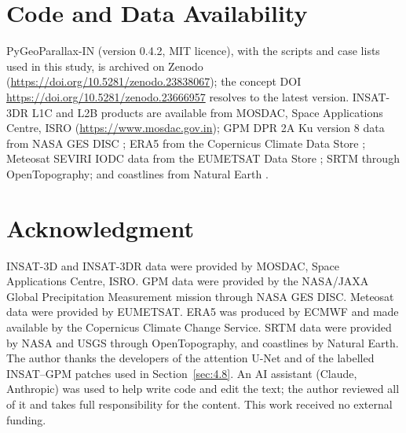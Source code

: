 \documentclass[journal]{IEEEtran}
\begin{document}









\appendix


\section*{Code and Data Availability}
PyGeoParallax-IN (version 0.4.2, MIT licence), with the scripts and case lists used in this study, is archived on Zenodo \cite{pygeoparallax} (\url{https://doi.org/10.5281/zenodo.23838067}); the concept DOI \url{https://doi.org/10.5281/zenodo.23666957} resolves to the latest version. INSAT-3DR L1C and L2B products are available from MOSDAC, Space Applications Centre, ISRO (\url{https://www.mosdac.gov.in}); GPM DPR 2A Ku version 8 data from NASA GES DISC \cite{gpm2aku_v08}; ERA5 from the Copernicus Climate Data Store \cite{c3s2018}; Meteosat SEVIRI IODC data from the EUMETSAT Data Store \cite{eumetsat_iodc}; SRTM \cite{farr2007} through OpenTopography; and coastlines from Natural Earth \cite{naturalearth}.

\section*{Acknowledgment}
INSAT-3D and INSAT-3DR data were provided by MOSDAC, Space Applications Centre, ISRO. GPM data were provided by the NASA/JAXA Global Precipitation Measurement mission through NASA GES DISC. Meteosat data were provided by EUMETSAT. ERA5 was produced by ECMWF and made available by the Copernicus Climate Change Service. SRTM data were provided by NASA and USGS through OpenTopography, and coastlines by Natural Earth. The author thanks the developers of the attention U-Net and of the labelled INSAT--GPM patches used in Section~\ref{sec:4.8}. An AI assistant (Claude, Anthropic) was used to help write code and edit the text; the author reviewed all of it and takes full responsibility for the content. This work received no external funding.



\end{document}
